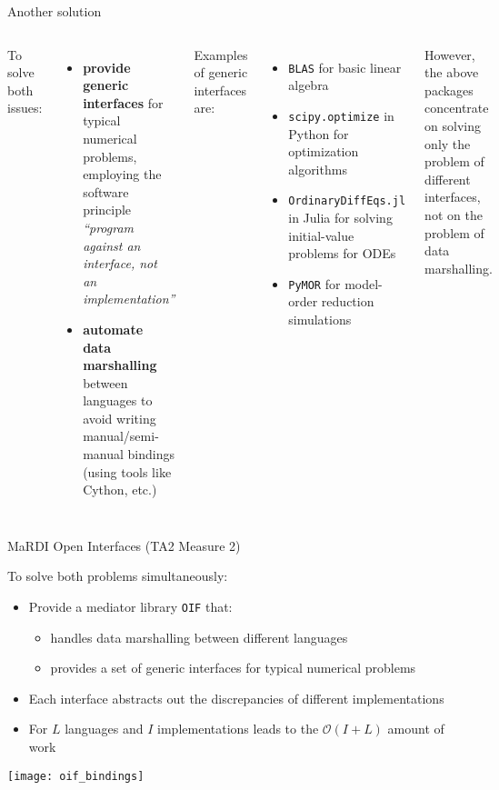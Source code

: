 \documentclass[
  10pt,
  aspectratio=169,
  english,
]{beamer}
\begin{document}
\begin{frame}{Another solution}
  \begin{columns}[t]
    To solve both issues:
    \begin{itemize}
      \item \textbf{provide generic interfaces} for typical numerical problems,
            employing the software principle
            \emph{``program against an interface, not an implementation''}
      \item \textbf{automate data marshalling} between languages
            to avoid writing manual/semi-manual bindings
            (using tools like Cython, etc.)
    \end{itemize}

    Examples of generic interfaces are:
    \begin{itemize}
      \item \texttt{BLAS} for basic linear algebra
      \item \texttt{scipy.optimize} in Python for optimization algorithms
      \item \texttt{OrdinaryDiffEqs.jl} in Julia for solving initial-value problems for ODEs
      \item \texttt{PyMOR} for model-order reduction simulations
    \end{itemize}

    However, the above packages concentrate on solving only
    the problem of different interfaces, not on the problem
    of data marshalling.
  \end{columns}
\end{frame}

\begin{frame}{MaRDI Open Interfaces (TA2 Measure 2)}
  \begin{minipage}{0.45\textwidth}
    To solve both problems simultaneously:
    \begin{itemize}
      \item Provide a mediator library \texttt{OIF} that:
            \begin{itemize}
              \item handles data marshalling between different languages
              \item provides a set of generic interfaces
                    for typical numerical problems
            \end{itemize}
      \item Each interface abstracts out the discrepancies
            of different implementations
      \item For $L$ languages and $I$ implementations leads to
            the $\mathcal O (I + L)$ amount of work
    \end{itemize}
  \end{minipage}\hfill%
  \begin{minipage}{0.50\textwidth}
    \centering
    \texttt{[image: oif\_bindings]}
  \end{minipage}
\end{frame}
\end{document}
